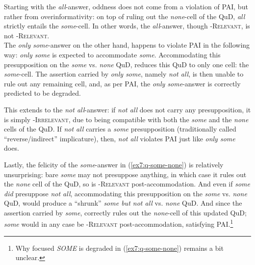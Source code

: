 \begin{exe}
	\label{ex7:q-some-none}
	\begin{xlist}
	\end{xlist}
\end{exe}

Starting with the \textit{all}-answer, oddness does not come from a violation of PAI, but rather from overinformativity: on top of ruling out the \textit{none}-cell of the QuD, \textit{all} strictly entails the \textit{some}-cell. In other words, the \textit{all}-answer, though \textsc{\citeauthor{Roberts2012}-Relevant}, is not \textsc{\citeauthor*{Lewis1988}-Relevant}.\\

The \textit{only some}-answer on the other hand, happens to violate PAI in the following way: \textit{only some} is expected to accommodate \textit{some}. Accommodating this presupposition on the \textit{some} vs. \textit{none} QuD, reduces this QuD to only one cell: the \textit{some}-cell. The assertion carried by \textit{only some}, namely \textit{not all}, is then unable to rule out any remaining cell, and, as per PAI, the \textit{only some}-answer is correctly predicted to be degraded.

This extends to the \textit{not all}-answer: if \textit{not all} does not carry any presupposition, it is simply \textsc{\citeauthor{Roberts2012}-Irrelevant}, due to being compatible with both the \textit{some} and the \textit{none} cells of the QuD. If \textit{not all} carries a \textit{some} presupposition (traditionally called ``reverse/indirect'' implicature), then, \textit{not all} violates PAI just like \textit{only some} does.

Lastly, the felicity of the \textit{some}-answer in (\ref{ex7:q-some-none}) is relatively unsurprising: bare \textit{some} may not presuppose anything, in which case it rules out the \textit{none} cell of the QuD, so is \textsc{\citeauthor{Roberts2012}-Relevant} post-accommodation. And even if \textit{some} \textit{did} presuppose \textit{not all}, accommodating this presupposition on the \textit{some} vs. \textit{none} QuD, would produce a ``shrunk'' \textit{some but not all} vs. \textit{none} QuD. And since the assertion carried by \textit{some}, correctly rules out the \textit{none}-cell of this updated QuD; \textit{some} would in any case be \textsc{\citeauthor{Roberts2012}-Relevant} post-accommodation, satisfying PAI.\footnote{Why focused \textit{SOME} is degraded in (\ref{ex7:q-some-none}) remains a bit unclear.}\\

